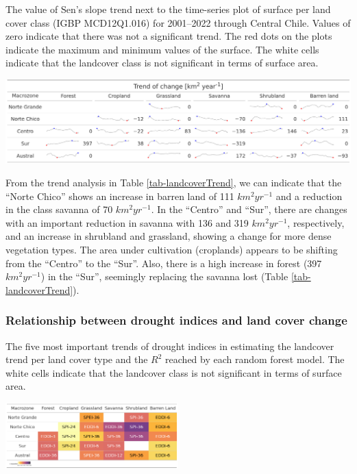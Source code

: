 \documentclass[
  authoryear,
  preprint,
  3p,
  onecolumn]{elsarticle}
\begin{document}
\begin{table}[!ht]
\caption{The value of Sen's slope trend next to the time-series plot of surface per land cover class (IGBP MCD12Q1.016) for 2001–2022 through Central Chile. Values of zero indicate that there was not a significant trend. The red dots on the plots indicate the maximum and minimum values of the surface. The white cells indicate that the landcover class is not significant in terms of surface area.}
\label{tab-landcoverTrend}
\includegraphics[]{../output/figs/table_var_landcover_macro.png}
\end{table}

From the trend analysis in Table \ref{tab-landcoverTrend}, we can
indicate that the ``Norte Chico'' shows an increase in barren land of
111 \(km^2 yr^{-1}\) and a reduction in the class savanna of 70
\(km^2 yr^{-1}\). In the ``Centro'' and ``Sur'', there are changes with
an important reduction in savanna with 136 and 319 \(km^2 yr^{-1}\),
respectively, and an increase in shrubland and grassland, showing a
change for more dense vegetation types. The area under cultivation
(croplands) appears to be shifting from the ``Centro'' to the ``Sur''.
Also, there is a high increase in forest (397 \(km^2 yr^{-1}\)) in the
``Sur'', seemingly replacing the savanna lost (Table
\ref{tab-landcoverTrend}).

\hypertarget{relationship-between-drought-indices-and-land-cover-change}{%
\subsubsection{Relationship between drought indices and land cover
change}\label{relationship-between-drought-indices-and-land-cover-change}}

\begin{table}[!ht]
\caption{The five most important trends of drought indices in estimating the landcover trend per land cover type and the $R^2$ reached by each random forest model. The white cells indicate that the landcover class is not significant in terms of surface area.}
\label{tab-landcoverTrendRF}
\includegraphics[width=0.5\textwidth]{../output/figs/table_r2_most_important_variables.png}
\end{table}
\end{document}
